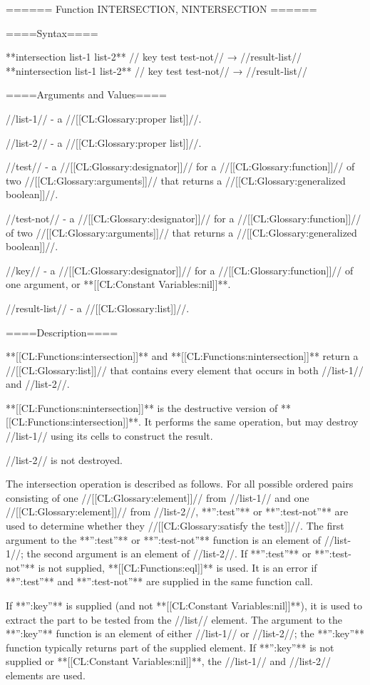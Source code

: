 ====== Function INTERSECTION, NINTERSECTION ======

====Syntax====

**intersection {list-1 list-2** //\key} key test test-not// → //result-list// **nintersection {list-1 list-2** //\key} key test test-not// → //result-list//

====Arguments and Values====

//list-1// - a //[[CL:Glossary:proper list]]//.

//list-2// - a //[[CL:Glossary:proper list]]//.

//test// - a //[[CL:Glossary:designator]]// for a //[[CL:Glossary:function]]// of two //[[CL:Glossary:arguments]]// that returns a //[[CL:Glossary:generalized boolean]]//.

//test-not// - a //[[CL:Glossary:designator]]// for a //[[CL:Glossary:function]]// of two //[[CL:Glossary:arguments]]// that returns a //[[CL:Glossary:generalized boolean]]//.

//key// - a //[[CL:Glossary:designator]]// for a //[[CL:Glossary:function]]// of one argument, or **[[CL:Constant Variables:nil]]**.

//result-list// - a //[[CL:Glossary:list]]//.

====Description====

**[[CL:Functions:intersection]]** and **[[CL:Functions:nintersection]]** return a //[[CL:Glossary:list]]// that contains every element that occurs in both //list-1// and //list-2//.

**[[CL:Functions:nintersection]]** is the destructive version of **[[CL:Functions:intersection]]**. It performs the same operation, but may destroy //list-1// using its cells to construct the result.

//list-2// is not destroyed.

The intersection operation is described as follows. For all possible ordered pairs consisting of one //[[CL:Glossary:element]]// from //list-1// and one //[[CL:Glossary:element]]// from //list-2//, **'':test''** or **'':test-not''** are used to determine whether they //[[CL:Glossary:satisfy the test]]//. The first argument to the **'':test''** or **'':test-not''** function is an element of //list-1//; the second argument is an element of //list-2//. If **'':test''** or **'':test-not''** is not supplied, **[[CL:Functions:eql]]** is used. It is an error if **'':test''** and **'':test-not''** are supplied in the same function call.

If **'':key''** is supplied (and not **[[CL:Constant Variables:nil]]**), it is used to extract the part to be tested from the //list// element. The argument to the **'':key''** function is an element of either //list-1// or //list-2//; the **'':key''** function typically returns part of the supplied element. If **'':key''** is not supplied or **[[CL:Constant Variables:nil]]**, the //list-1// and //list-2// elements are used.


